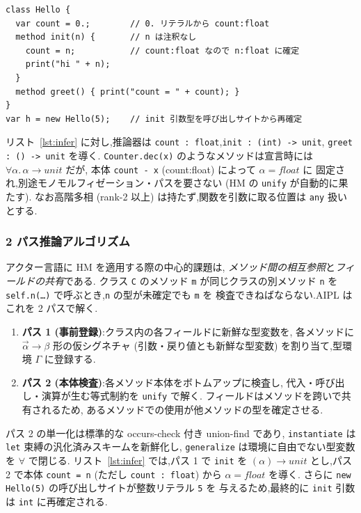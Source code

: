 \documentclass[11pt,a4paper]{article}
\newcommand{\code}[1]{\texttt{\small #1}}
\begin{document}
\begin{lstlisting}[caption={注釈なし=全推論。呼び出しサイトが型を確定する},label={lst:infer},float=h]
class Hello {
  var count = 0.;        // 0. リテラルから count:float
  method init(n) {       // n は注釈なし
    count = n;           // count:float なので n:float に確定
    print("hi " + n);
  }
  method greet() { print("count = " + count); }
}
var h = new Hello(5);    // init 引数型を呼び出しサイトから再確定
\end{lstlisting}

リスト~\ref{lst:infer} に対し,推論器は
\code{count : float},\code{init : (int) -> unit},
\code{greet : () -> unit} を導く.
\code{Counter.dec(x)} のようなメソッドは宣言時には
$\forall \alpha.\,\alpha \to \mathit{unit}$ だが,
本体 \code{count - x} (count:float) によって $\alpha = \mathit{float}$ に
固定され,別途モノモルフィゼーション・パスを要さない
(HM の \code{unify} が自動的に果たす).
なお高階多相 (rank-2 以上) は持たず,関数を引数に取る位置は
\code{any} 扱いとする.

\subsubsection{2 パス推論アルゴリズム}
アクター言語に HM を適用する際の中心的課題は,
\emph{メソッド間の相互参照}と\emph{フィールドの共有}である.
クラス \code{C} のメソッド \code{m} が同じクラスの別メソッド \code{n} を
\code{self.n(\dots)} で呼ぶとき,\code{n} の型が未確定でも \code{m} を
検査できねばならない.AIPL はこれを 2 パスで解く.

\begin{enumerate}[leftmargin=1.6em,itemsep=2pt]
  \item \textbf{パス 1 (事前登録)}:クラス内の各フィールドに新鮮な型変数を,
        各メソッドに $\vec{\alpha}\to\beta$ 形の仮シグネチャ
        (引数・戻り値とも新鮮な型変数) を割り当て,型環境
        $\Gamma$ に登録する.
  \item \textbf{パス 2 (本体検査)}:各メソッド本体をボトムアップに検査し,
        代入・呼び出し・演算が生む等式制約を \code{unify} で解く.
        フィールドはメソッドを跨いで共有されるため,
        あるメソッドでの使用が他メソッドの型を確定させる.
\end{enumerate}

パス 2 の単一化は標準的な occurs-check 付き union-find であり,
\code{instantiate} は \code{let} 束縛の汎化済みスキームを新鮮化し,
\code{generalize} は環境に自由でない型変数を $\forall$ で閉じる.
リスト~\ref{lst:infer} では,パス 1 で \code{init} を
$(\alpha)\to\mathit{unit}$ とし,パス 2 で本体 \code{count = n}
(ただし \code{count : float}) から $\alpha = \mathit{float}$ を導く.
さらに \code{new Hello(5)} の呼び出しサイトが整数リテラル \code{5} を
与えるため,最終的に \code{init} 引数は \code{int} に再確定される.
\end{document}
